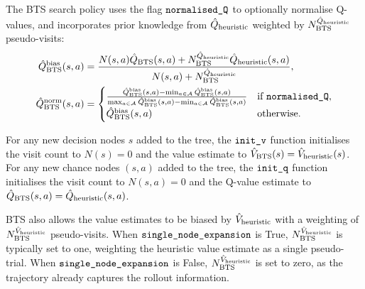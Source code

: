     The BTS search policy uses the flag ${\textnormal{\texttt{normalised\_Q}}}$ to optionally normalise Q-values, and incorporates prior knowledge from ${\hat{Q}_{\textnormal{heuristic}}}$ weighted by $N^{{\hat{Q}_{\textnormal{heuristic}}}}_{{\textnormal{BTS}}}$ pseudo-visits:
    \begin{align}
        {\hat{Q}^{{\textnormal{bias}}}_{{\textnormal{BTS}}}}(s,a) &= \frac{N(s,a) {\hat{Q}_{{\textnormal{BTS}}}}(s,a) +  N^{{\hat{Q}_{\textnormal{heuristic}}}}_{{\textnormal{BTS}}} {\hat{Q}_{\textnormal{heuristic}}}(s,a)}{N(s,a)+N^{{\hat{Q}_{\textnormal{heuristic}}}}_{{\textnormal{BTS}}}}, \\
        {\hat{Q}^{{\textnormal{norm}}}_{{\textnormal{BTS}}}}(s,a) &= 
        \begin{cases}
            \frac{{\hat{Q}^{{\textnormal{bias}}}_{{\textnormal{BTS}}}}(s,a)-\min_{a\in\mathcal{A}}{\hat{Q}^{{\textnormal{bias}}}_{{\textnormal{BTS}}}}(s,a)}{\max_{a\in\mathcal{A}}{\hat{Q}^{{\textnormal{bias}}}_{{\textnormal{BTS}}}}(s,a)-\min_{a\in\mathcal{A}}{\hat{Q}^{{\textnormal{bias}}}_{{\textnormal{BTS}}}}(s,a)} & \text{if } {\textnormal{\texttt{normalised\_Q}}}, \\
            {\hat{Q}^{{\textnormal{bias}}}_{{\textnormal{BTS}}}}(s,a) & \text{otherwise.}
        \end{cases}
    \end{align}

    \sloppypar{
        The search policy of BTS is similar to MENTS (Section \ref{sec:2-4-4-ments}), but using a variable temperature and (the normalised and biased) Bellman value estimates rather than soft value estimates.
        \begin{align}
            \pibts(a|s) &= (1-\lambdabts)\rhobts(a|s) + \frac{\lambdabts}{|\cl{A}|}, 
                        \label{eq:4:bts_search_policy} \\ 
            \rhobts(a|s) &\propto \exp\left(\frac{\Qbtsnorm(s,a)}{\alphabts(N(s))}\right),
                        \label{eq:4:bts_value_policy} \\
            \lambda(s,\epsilon) &= \min\left(1, \frac{\epsilon}{\log(e+N(s))}\right), \label{eq:4:lambda}
        \end{align} 
        where $\epsbts \in [0,\infty)$ is an exploration parameter, and a temperature of \mbox{$\alphabts(N(s))=0$} is taken to mean that \mbox{$\rhobts$} selects greedily with respect to \mbox{$\Qbtsnorm$}.
    }

    For any new decision nodes $s$ added to the tree, the ${\textnormal{\texttt{init\_v}}}$ function initialises the visit count to $N(s)=0$ and the value estimate to ${\hat{V}_{{\textnormal{BTS}}}}(s)={\hat{V}_{\textnormal{heuristic}}}(s)$. For any new chance nodes $(s,a)$ added to the tree, the ${\textnormal{\texttt{init\_q}}}$ function initialises the visit count to $N(s,a)=0$ and the Q-value estimate to ${\hat{Q}_{{\textnormal{BTS}}}}(s,a)={\hat{Q}_{\textnormal{heuristic}}}(s,a)$.
    
    BTS also allows the value estimates to be biased by ${\hat{V}_{\textnormal{heuristic}}}$ with a weighting of $N^{{\hat{V}_{\textnormal{heuristic}}}}_{{\textnormal{BTS}}}$ pseudo-visits. When ${\textnormal{\texttt{single\_node\_expansion}}}$ is True, $N^{{\hat{V}_{\textnormal{heuristic}}}}_{{\textnormal{BTS}}}$ is typically set to one, weighting the heuristic value estimate as a single pseudo-trial. When ${\textnormal{\texttt{single\_node\_expansion}}}$ is False, $N^{{\hat{V}_{\textnormal{heuristic}}}}_{{\textnormal{BTS}}}$ is set to zero, as the trajectory already captures the rollout information.
    
